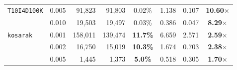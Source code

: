 \documentclass[runningheads,orivec]{llncs}
\begin{document}
\begin{table}[ht]
{\begin{tabular}{l c rr c rr c}
\midrule
\texttt{T10I4D100K} & 0.005 &    91,823 &    91,803 & 0.02\% &  1.138 & 0.107 & \textbf{10.60$\times$} \\
                    & 0.010 &    19,503 &    19,497 & 0.03\% &  0.386 & 0.047 & \textbf{8.29$\times$} \\
\midrule
\texttt{kosarak}    & 0.001 &   158,011 &   139,474 & \textbf{11.7\%} &  6.659 & 2.571 & \textbf{2.59$\times$} \\
                    & 0.002 &    16,750 &    15,019 & \textbf{10.3\%} &  1.674 & 0.703 & \textbf{2.38$\times$} \\
                    & 0.005 &     1,445 &     1,373 & \textbf{5.0\%}  &  0.518 & 0.305 & \textbf{1.70$\times$} \\
\bottomrule
\end{tabular}
}
\end{table}
\end{document}
